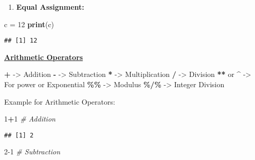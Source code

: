 \documentclass[
]{article}
\newenvironment{Shaded}{\begin{snugshade}}{\end{snugshade}}
\newcommand{\CommentTok}[1]{\textcolor[rgb]{0.56,0.35,0.01}{\textit{#1}}}
\newcommand{\DecValTok}[1]{\textcolor[rgb]{0.00,0.00,0.81}{#1}}
\newcommand{\FunctionTok}[1]{\textcolor[rgb]{0.13,0.29,0.53}{\textbf{#1}}}
\newcommand{\NormalTok}[1]{#1}
\newcommand{\OtherTok}[1]{\textcolor[rgb]{0.56,0.35,0.01}{#1}}
\newcommand{\SpecialCharTok}[1]{\textcolor[rgb]{0.81,0.36,0.00}{\textbf{#1}}}
\providecommand{\tightlist}{%
  \setlength{\itemsep}{0pt}\setlength{\parskip}{0pt}}
\begin{document}
\begin{enumerate}
\def\labelenumi{\arabic{enumi}.}
\setcounter{enumi}{2}
\tightlist
\item
  \textbf{Equal Assignment:}
\end{enumerate}

\begin{Shaded}
\begin{Highlighting}[]
\NormalTok{c }\OtherTok{=} \DecValTok{12}
\FunctionTok{print}\NormalTok{(c)}
\end{Highlighting}
\end{Shaded}

\begin{verbatim}
## [1] 12
\end{verbatim}

\ul{\textbf{Arithmetic Operators}}

\begin{Shaded}
\begin{Highlighting}[]
\SpecialCharTok{+} \OtherTok{{-}\textgreater{}}\NormalTok{ Addition}
\SpecialCharTok{{-}} \OtherTok{{-}\textgreater{}}\NormalTok{ Subtraction }
\SpecialCharTok{*} \OtherTok{{-}\textgreater{}}\NormalTok{ Multiplication}
\SpecialCharTok{/} \OtherTok{{-}\textgreater{}}\NormalTok{ Division}
\SpecialCharTok{**}\NormalTok{ or }\SpecialCharTok{\^{}} \OtherTok{{-}\textgreater{}}\NormalTok{ For power or Exponential}
\SpecialCharTok{\%\%} \OtherTok{{-}\textgreater{}}\NormalTok{ Modulus}
\SpecialCharTok{\%/\%} \OtherTok{{-}\textgreater{}}\NormalTok{ Integer Division}
\end{Highlighting}
\end{Shaded}

Example for Arithmetic Operators:

\begin{Shaded}
\begin{Highlighting}[]
\DecValTok{1}\SpecialCharTok{+}\DecValTok{1} \CommentTok{\# Addition}
\end{Highlighting}
\end{Shaded}

\begin{verbatim}
## [1] 2
\end{verbatim}

\begin{Shaded}
\begin{Highlighting}[]
\DecValTok{2{-}1} \CommentTok{\# Subtraction}
\end{Highlighting}
\end{Shaded}
\end{document}
